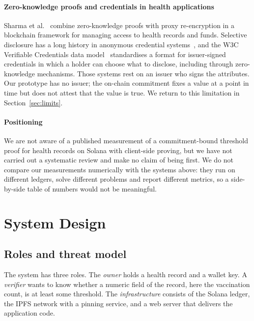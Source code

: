 \paragraph{Zero-knowledge proofs and credentials in health applications}
Sharma et al.~\cite{sharma2020zkp} combine zero-knowledge proofs with proxy
re-encryption in a blockchain framework for managing access to health records
and funds. Selective disclosure has a long history in anonymous credential
systems~\cite{camenisch2001credentials}, and the W3C Verifiable Credentials
data model~\cite{w3c2025vc} standardises a format for issuer-signed
credentials in which a holder can choose what to disclose, including through
zero-knowledge mechanisms. Those systems rest on an issuer who signs the
attributes. Our prototype has no issuer; the on-chain commitment fixes a
value at a point in time but does not attest that the value is true. We
return to this limitation in Section~\ref{sec:limits}.

\paragraph{Positioning}
We are not aware of a published measurement of a commitment-bound threshold
proof for health records on Solana with client-side proving, but we have not
carried out a systematic review and make no claim of being first. We do not
compare our measurements numerically with the systems above: they run on
different ledgers, solve different problems and report different metrics, so
a side-by-side table of numbers would not be meaningful.

\section{System Design}\label{sec:design}

\subsection{Roles and threat model}\label{sec:threat}

The system has three roles. The \emph{owner} holds a health record and a
wallet key. A \emph{verifier} wants to know whether a numeric field of the
record, here the vaccination count, is at least some threshold. The
\emph{infrastructure} consists of the Solana ledger, the IPFS network with a
pinning service, and a web server that delivers the application code.

